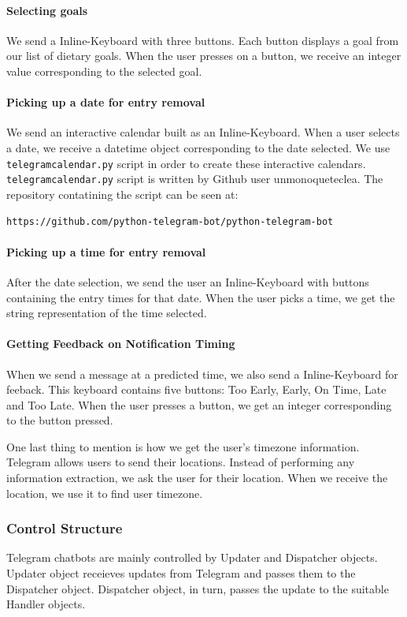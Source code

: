 \paragraph{Selecting goals} 
We send a Inline-Keyboard with three buttons. 
Each button displays a goal from our list of dietary goals. 
When the user presses on a button, we receive an integer value corresponding to the selected goal.

\paragraph{Picking up a date for entry removal} 
We send an interactive calendar built as an Inline-Keyboard.
When a user selects a date, we receive a datetime object corresponding to the date selected.
We use \texttt{telegramcalendar.py} script in order to create these interactive calendars.
\texttt{telegramcalendar.py} script is written by Github user unmonoqueteclea.
The repository contatining the script can be seen at:

\texttt{https://github.com/python-telegram-bot/python-telegram-bot}

\paragraph{Picking up a time for entry removal} 
After the date selection, we send the user an Inline-Keyboard with buttons containing the entry times for that date.
When the user picks a time, we get the string representation of the time selected.

\paragraph{Getting Feedback on Notification Timing} 
When we send a message at a predicted time, we also send a Inline-Keyboard for feeback.
This keyboard contains five buttons: Too Early, Early, On Time, Late and Too Late.
When the user presses a button, we get an integer corresponding to the button pressed.

One last thing to mention is how we get the user's timezone information.
Telegram allows users to send their locations.
Instead of performing any information extraction, we ask the user for their location.
When we receive the location, we use it to find user timezone.

\subsubsection{Control Structure}
Telegram chatbots are mainly controlled by Updater and Dispatcher objects.
Updater object receieves updates from Telegram and passes them to the Dispatcher object.
Dispatcher object, in turn, passes the update to the suitable Handler objects.

